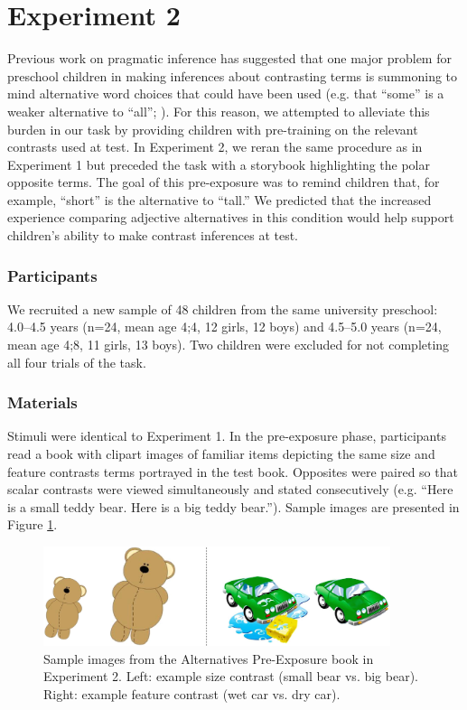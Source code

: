 \documentclass[man]{apa2}
\begin{document}
\section{Experiment 2}

Previous work on pragmatic inference has suggested that one major problem for preschool children in making inferences about contrasting terms is summoning to mind alternative word choices that could have been used (e.g. that ``some'' is a weaker alternative to ``all''; ). For this reason, we attempted to alleviate this burden in our task by providing children with pre-training on the relevant contrasts used at test. In Experiment 2, we reran the same procedure as in Experiment 1 but preceded the task with a storybook highlighting the polar opposite terms. The goal of this pre-exposure was to remind children that, for example, ``short'' is the alternative to ``tall.'' We predicted that the increased experience comparing adjective alternatives in this condition would help support children's ability to make contrast inferences at test.

\subsubsection{Participants}

We recruited a new sample of 48 children from the same university preschool: 4.0--4.5 years (n=24, mean age 4;4, 12 girls, 12 boys) and 4.5--5.0 years (n=24, mean age 4;8, 11 girls, 13 boys). Two children were excluded for not completing all four trials of the task.

\subsubsection{Materials}

Stimuli were identical to Experiment 1. In the pre-exposure phase, participants read a book with clipart images of familiar items depicting the same size and feature contrasts terms portrayed in the test book. Opposites were paired so that scalar contrasts were viewed simultaneously and stated consecutively (e.g. ``Here is a small teddy bear. Here is a big teddy bear.'').  Sample images are presented in Figure \ref{fig:book_demo}.

\begin{figure}[t] 
  \begin{center} 
    \includegraphics[width=4in]{figures/aliens_book_demo_mod.png} 
    \caption{\label{fig:book_demo} Sample images from the Alternatives Pre-Exposure book in Experiment 2. Left: example size contrast (small bear vs. big bear). Right: example feature contrast (wet car vs. dry car).}
  \end{center} 
\vspace{-10ex}
\end{figure}
\end{document}
